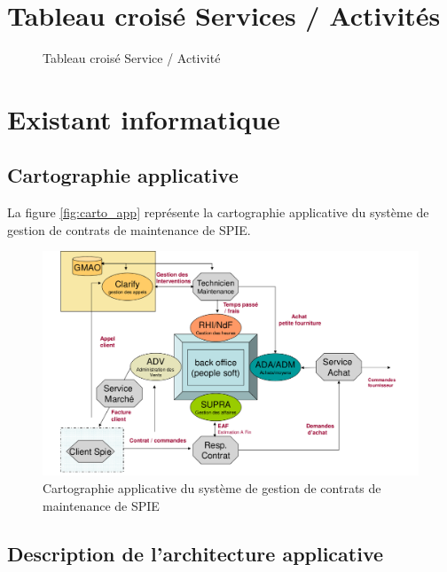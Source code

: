 \pagebreak

\section{Tableau crois\'e Services / Activit\'es}

\begin{landscape}
\begin{figure}[h]
    \centering
    \caption{Tableau crois\'e Service / Activit\'e}
    \label{tableau:service_activitee}
\end{figure}
\end{landscape}


\section{Existant informatique}

\subsection{Cartographie applicative}

La figure \vref{fig:carto_app} représente la cartographie applicative du système de gestion de contrats de maintenance de SPIE.

\begin{figure}[h!]
    \centering
    \includegraphics[width=140mm]{./images/cartographie_applicative.png}
    \caption{Cartographie applicative du système de gestion de contrats de maintenance de SPIE}
    \label{fig:carto_app}
\end{figure}

\subsection{Description de l'architecture applicative}

